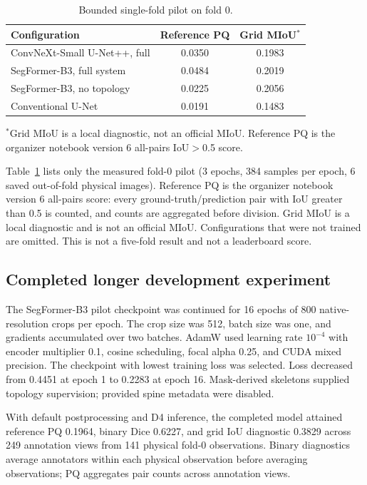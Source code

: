 \documentclass[conference]{IEEEtran}
\begin{document}
\begin{table}[t]
\centering
\caption{Bounded single-fold pilot on fold 0.}
\label{tab:ablations}
\footnotesize
\setlength{\tabcolsep}{3pt}
\begin{tabular*}{\columnwidth}{@{\extracolsep{\fill}}lcc@{}}
\toprule
Configuration & Reference PQ & Grid MIoU$^*$\\
\midrule
ConvNeXt-Small U-Net++, full & 0.0350 & 0.1983\\
SegFormer-B3, full system & 0.0484 & 0.2019\\
SegFormer-B3, no topology & 0.0225 & 0.2056\\
Conventional U-Net & 0.0191 & 0.1483\\
\bottomrule
\end{tabular*}
\vspace{0.4ex}
\parbox{\columnwidth}{\raggedright $^*$Grid MIoU is a local diagnostic, not an official MIoU. Reference PQ is the organizer notebook version 6 all-pairs IoU$>$0.5 score.}
\end{table}

Table~\ref{tab:ablations} lists only the measured fold-0 pilot (3 epochs, 384 samples per epoch, 6 saved out-of-fold physical images). Reference PQ is the organizer notebook version 6 all-pairs score: every ground-truth/prediction pair with IoU greater than 0.5 is counted, and counts are aggregated before division. Grid MIoU is a local diagnostic and is not an official MIoU. Configurations that were not trained are omitted. This is not a five-fold result and not a leaderboard score.

\subsection{Completed longer development experiment}
The SegFormer-B3 pilot checkpoint was continued for 16 epochs of 800 native-resolution crops per epoch. The crop size was 512, batch size was one, and gradients accumulated over two batches. AdamW used learning rate $10^{-4}$ with encoder multiplier 0.1, cosine scheduling, focal alpha 0.25, and CUDA mixed precision. The checkpoint with lowest training loss was selected. Loss decreased from 0.4451 at epoch 1 to 0.2283 at epoch 16. Mask-derived skeletons supplied topology supervision; provided spine metadata were disabled.

With default postprocessing and D4 inference, the completed model attained reference PQ 0.1964, binary Dice 0.6227, and grid IoU diagnostic 0.3829 across 249 annotation views from 141 physical fold-0 observations. Binary diagnostics average annotators within each physical observation before averaging observations; PQ aggregates pair counts across annotation views.
\end{document}
